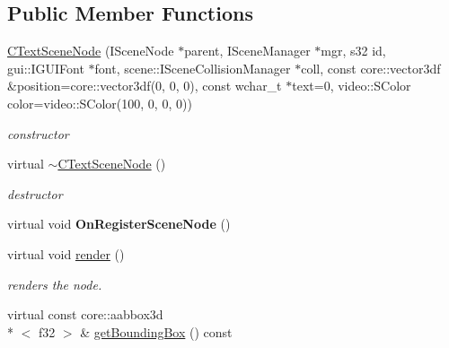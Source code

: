 \subsection*{Public Member Functions}
\begin{DoxyCompactItemize}
\item 
\hypertarget{classirr_1_1scene_1_1_c_text_scene_node_af1383c135b87200016836b272ecb323e}{\hyperlink{classirr_1_1scene_1_1_c_text_scene_node_af1383c135b87200016836b272ecb323e}{C\-Text\-Scene\-Node} (I\-Scene\-Node $\ast$parent, I\-Scene\-Manager $\ast$mgr, s32 id, gui\-::\-I\-G\-U\-I\-Font $\ast$font, scene\-::\-I\-Scene\-Collision\-Manager $\ast$coll, const core\-::vector3df \&position=core\-::vector3df(0, 0, 0), const wchar\-\_\-t $\ast$text=0, video\-::\-S\-Color color=video\-::\-S\-Color(100, 0, 0, 0))}\label{classirr_1_1scene_1_1_c_text_scene_node_af1383c135b87200016836b272ecb323e}

\begin{DoxyCompactList}\small\item\em constructor \end{DoxyCompactList}\item 
\hypertarget{classirr_1_1scene_1_1_c_text_scene_node_a5fd1db9ba0424f17cb314a69e276a099}{virtual \hyperlink{classirr_1_1scene_1_1_c_text_scene_node_a5fd1db9ba0424f17cb314a69e276a099}{$\sim$\-C\-Text\-Scene\-Node} ()}\label{classirr_1_1scene_1_1_c_text_scene_node_a5fd1db9ba0424f17cb314a69e276a099}

\begin{DoxyCompactList}\small\item\em destructor \end{DoxyCompactList}\item 
\hypertarget{classirr_1_1scene_1_1_c_text_scene_node_a2d224f139d635629d7a699a75fb0fa0b}{virtual void {\bfseries On\-Register\-Scene\-Node} ()}\label{classirr_1_1scene_1_1_c_text_scene_node_a2d224f139d635629d7a699a75fb0fa0b}

\item 
\hypertarget{classirr_1_1scene_1_1_c_text_scene_node_abd5d9de8a403ef17a15589b22eb3f4f5}{virtual void \hyperlink{classirr_1_1scene_1_1_c_text_scene_node_abd5d9de8a403ef17a15589b22eb3f4f5}{render} ()}\label{classirr_1_1scene_1_1_c_text_scene_node_abd5d9de8a403ef17a15589b22eb3f4f5}

\begin{DoxyCompactList}\small\item\em renders the node. \end{DoxyCompactList}\item 
\hypertarget{classirr_1_1scene_1_1_c_text_scene_node_aa0c78276b03e3bb195040c6861e678ef}{virtual const core\-::aabbox3d\\*
$<$ f32 $>$ \& \hyperlink{classirr_1_1scene_1_1_c_text_scene_node_aa0c78276b03e3bb195040c6861e678ef}{get\-Bounding\-Box} () const }\label{classirr_1_1scene_1_1_c_text_scene_node_aa0c78276b03e3bb195040c6861e678ef}


\end{DoxyCompactItemize}
